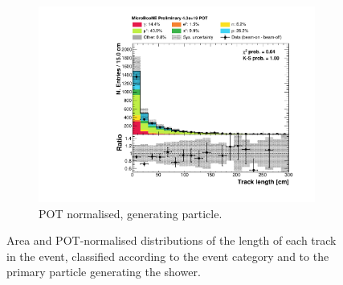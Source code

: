 \begin{figure}[htbp]
\begin{subfigure}{0.49\textwidth}
    \includegraphics[width=\linewidth]{figures/h_track_length_pdg.pdf}
    \caption{POT normalised, generating particle.} \label{fig:length_pdg}
  \end{subfigure}
  \caption{Area and POT-normalised distributions of the length of each track in the event, classified according to the event category and to the primary particle generating the shower.}
\end{figure}